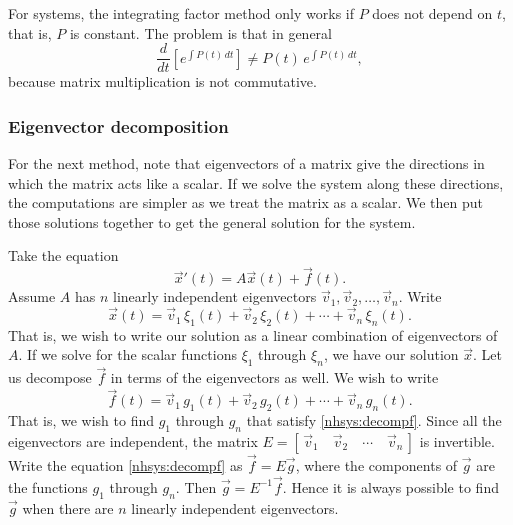 For systems, the integrating factor method
only works if $P$ does not depend on $t$, that is,
$P$ is constant.  The
problem is that in general
\begin{equation*}
\frac{d}{dt} \left[ e^{\int P(t)\,dt} \right] \not= P(t) \, e^{\int P(t)\,dt} ,
\end{equation*}
because matrix multiplication is not commutative.

\subsubsection{Eigenvector decomposition}

For the next method, note that eigenvectors of a matrix give the 
directions in which the matrix acts like a scalar.  If we solve
the system along these directions, the computations are simpler as we
treat the matrix as a scalar.  We then
put those solutions together to get the general solution
for the system.

Take the equation
\begin{equation} \label{nhsys:ednhsys}
{\vec{x}}' (t) = A \vec{x}(t) + \vec{f}(t) .
\end{equation}
Assume $A$ has $n$ linearly independent eigenvectors
$\vec{v}_1, \vec{v}_2, \ldots, \vec{v}_n$.  Write
\begin{equation} \label{nhsys:decompx}
\vec{x}(t) =
\vec{v}_1 \, \xi_1(t) + 
\vec{v}_2 \, \xi_2(t) + \cdots +
\vec{v}_n \, \xi_n(t) .
\end{equation}
That is, we wish to write our solution as a linear combination of
eigenvectors of $A$.
If we solve for the scalar functions $\xi_1$ through $\xi_n$, we have
our solution $\vec{x}$.
Let us decompose $\vec{f}$ in terms of the eigenvectors as well.  We wish to write
\begin{equation} \label{nhsys:decompf}
\vec{f}(t) =
\vec{v}_1 \, g_1(t) + 
\vec{v}_2 \, g_2(t) + \cdots +
\vec{v}_n \, g_n(t) .
\end{equation}
That is, we wish to find $g_1$ through $g_n$ that satisfy
\eqref{nhsys:decompf}.  Since all the eigenvectors
are independent, the matrix
$E = [\, \vec{v}_1 \quad \vec{v}_2 \quad \cdots \quad \vec{v}_n \,]$
is invertible.  Write the equation \eqref{nhsys:decompf}
as $\vec{f} = E \vec{g}$, where the components of
$\vec{g}$ are the functions $g_1$ through $g_n$.
Then $\vec{g} = E^{-1} \vec{f}$.
Hence it is always possible to find $\vec{g}$ when there
are $n$ linearly independent eigenvectors.

